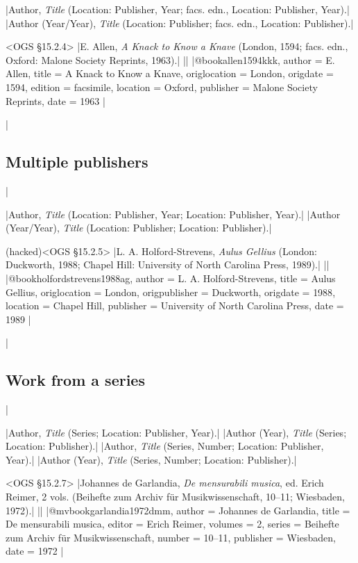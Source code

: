 \documentclass[extrafontsizes,11pt,a4paper,oneside]{memoir}
\newcommand*{\lit}[1]{\textsf{#1}}
\begin{document}
\specs
|Author, \emph{Title} (Location: Publisher, Year; \lit{facs. edn.}, Location: Publisher, Year).|%
|Author (Year/Year), \emph{Title} (Location: Publisher; \lit{facs. edn.}, Location: Publisher).|

\bibexample<OGS \S15.2.4>
|E. Allen, \emph{A Knack to Know a Knave} (London, 1594; facs. edn., Oxford: Malone Society Reprints, 1963).|%
||%
|@book{allen1594kkk,
  author = {E. Allen},
  title = {A Knack to Know a Knave},
  origlocation = {London},
  origdate = {1594},
  edition = {facsimile},
  location = {Oxford},
  publisher = {Malone Society Reprints},
  date = {1963}
}|

\todoc|
\subsection{Multiple publishers}
|

\specs
|Author, \emph{Title} (Location: Publisher, Year; Location: Publisher, Year).|%
|Author (Year/Year), \emph{Title} (Location: Publisher; Location: Publisher).|

\bibexample(hacked)<OGS \S15.2.5>
|L. A. Holford-Strevens, \emph{Aulus Gellius} (London: Duckworth, 1988; Chapel Hill: University of North Carolina Press, 1989).|%
||%
|@book{holfordstrevens1988ag,
  author = {L. A. Holford-Strevens},
  title = {Aulus Gellius},
  origlocation = {London},
  origpublisher = {Duckworth},
  origdate = {1988},
  location = {Chapel Hill},
  publisher = {University of North Carolina Press},
  date = {1989}
}|

\todoc|
\subsection{Work from a series}
|

\specs
|Author, \emph{Title} (Series; Location: Publisher, Year).|%
|Author (Year), \emph{Title} (Series; Location: Publisher).|
\specs
|Author, \emph{Title} (Series, Number; Location: Publisher, Year).|%
|Author (Year), \emph{Title} (Series, Number; Location: Publisher).|

\bibexample<OGS \S15.2.7>
|Johannes de Garlandia, \emph{De mensurabili musica}, ed. Erich Reimer, 2 vols. (Beihefte zum Archiv für Musikwissenschaft, 10--11; Wiesbaden, 1972).|%
||%
|@mvbook{garlandia1972dmm,
  author = {Johannes de Garlandia},
  title = {De mensurabili musica},
  editor = {Erich Reimer},
  volumes = {2},
  series = {Beihefte zum Archiv für Musikwissenschaft},
  number = {10--11},
  publisher = {Wiesbaden},
  date = {1972}
}|
\end{document}
